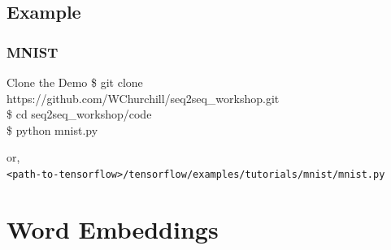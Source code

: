 \documentclass[pdf]{beamer}
\newenvironment{code}{\ttfamily\scriptsize\begin{block}}{\end{block}}
\begin{document}
\subsection{Example}
\begin{frame}
  \frametitle{MNIST}
  \begin{code}{Clone the Demo}
    \$ git clone https://github.com/WChurchill/seq2seq\_workshop.git\\
    \$ cd seq2seq\_workshop/code\\
    \$ python mnist.py\\
  \end{code}
  or,\\
  \footnotesize\texttt{<path-to-tensorflow>/tensorflow/examples/tutorials/mnist/mnist.py}
\end{frame}

\section{Word Embeddings}
\end{document}
